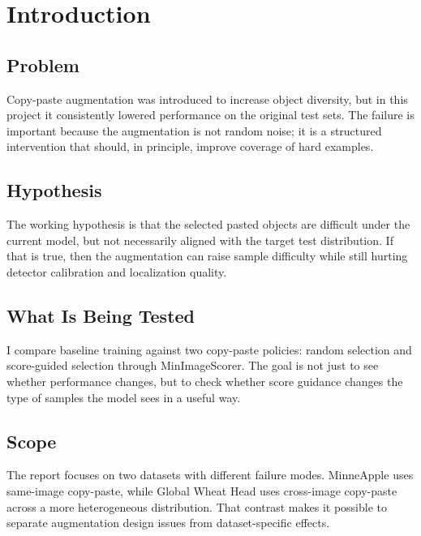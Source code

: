 \section{Introduction}

\subsection{Problem}
Copy-paste augmentation was introduced to increase object diversity, but in this project it consistently lowered performance on the original test sets. The failure is important because the augmentation is not random noise; it is a structured intervention that should, in principle, improve coverage of hard examples.

\subsection{Hypothesis}
The working hypothesis is that the selected pasted objects are difficult under the current model, but not necessarily aligned with the target test distribution. If that is true, then the augmentation can raise sample difficulty while still hurting detector calibration and localization quality.

\subsection{What Is Being Tested}
I compare baseline training against two copy-paste policies: random selection and score-guided selection through MinImageScorer. The goal is not just to see whether performance changes, but to check whether score guidance changes the type of samples the model sees in a useful way.

\subsection{Scope}
The report focuses on two datasets with different failure modes. MinneApple uses same-image copy-paste, while Global Wheat Head uses cross-image copy-paste across a more heterogeneous distribution. That contrast makes it possible to separate augmentation design issues from dataset-specific effects.

